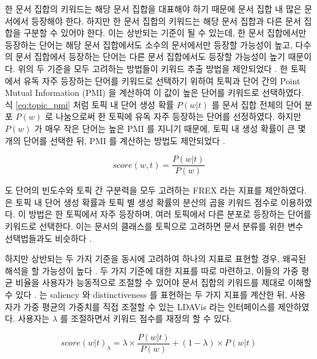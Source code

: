 \documentclass[11pt]{article}
\begin{document}
한 문서 집합의 키워드는 해당 문서 집합을 대표해야 하기 때문에 문서 집합 내 많은 문서에서 등장해야 한다.
하지만 한 문서 집합의 키워드는 해당 문서 집합과 다른 문서 집합을 구분할 수 있어야 한다.
이는 상반되는 기준이 될 수 있는데, 한 문서 집합에서만 등장하는 단어는 해당 문서 집합에서도 소수의 문서에서만 등장할 가능성이 높고, 다수의 문서 집합에서 등장하는 단어는 다른 문서 집합에서도 등장할 가능성이 높기 때문이다.
위의 두 기준을 모두 고려하는 방법들이 키워드 추출 방법을 제안되었다 \citep{bischof2012summarizing, newman2010evaluating, taddy2012estimation}.
한 토픽에서 유독 자주 등장하는 단어를 키워드로 선택하기 위하여 \citep{newman2010evaluating, taddy2012estimation, mimno2011optimizing} 토픽과 단어 간의 Point Mutual Information (PMI) 을 계산하여 이 값이 높은 단어를 키워드로 선택하였다.
식 \ref{eq:topic_pmi} 처럼 토픽 내 단어 생성 확률 $P(w \vert t)$ 를 문서 집합 전체의 단어 분포 $P(w)$ 로 나눔으로써 한 토픽에 유독 자주 등장하는 단어를 선정하였다.
하지만 $P(w)$ 가 매우 작은 단어는 높은 PMI 를 지니기 때문에, 토픽 내 생성 확률이 큰 몇 개의 단어를 선택한 뒤, PMI 를 계산하는 방법도 제안되었다 \citep{newman2010evaluating, alsumait2009topic}.

\begin{equation}
  \label{eq:topic_pmi}
  score(w,t) = \frac{P(w \vert t)}{P(w)}
\end{equation}

\citep{bischof2012summarizing} 도 단어의 빈도수와 토픽 간 구분력을 모두 고려하는 FREX 라는 지표를 제안하였다.
\citep{song2009topic} 은 토픽 내 단어 생성 확률과 토픽 별 생성 확률의 분산의 곱을 키워드 점수로 이용하였다.
이 방법은 한 토픽에서 자주 등장하며, 여러 토픽에서 다른 분포로 등장하는 단어를 키워드로 선택한다.
이는 문서의 클래스를 토픽으로 고려하면 문서 분류를 위한 변수 선택법들과도 비슷하다 \citep{largeron2011entropy, popescul2000automatic}.

하지만 상반되는 두 가지 기준을 동시에 고려하여 하나의 지표로 표현할 경우, 왜곡된 해석을 할 가능성이 높다 \citep{chuang2012interpretation}. 
두 가지 기준에 대한 지표를 따로 마련하고, 이들의 가중 평균 비율을 사용자가 능동적으로 조절할 수 있어야 문서 집합의 키워드를 제대로 이해할 수 있다 \citep{chuang2012interpretation}.
\citep{sievert2014ldavis}는 saliency 와 distinctiveness 를 표현하는 두 가지 지표를 계산한 뒤, 사용자가 가중 평균의 가중치를 직접 조절할 수 있는 LDAVis 라는 인터페이스를 제안하였다.
사용자는 $\lambda$ 를 조절하면서 키워드 점수를 재정의 할 수 있다.

\begin{equation}
  \label{eq:ldavis}
  score(w \vert t)_\lambda = \lambda \times \frac{P(w \vert t)}{P(w)} + (1 - \lambda) \times P(w \vert t)
\end{equation}
\end{document}

